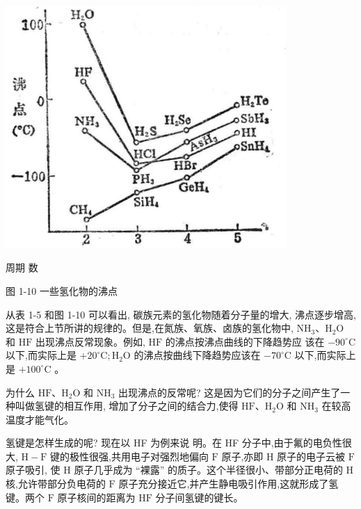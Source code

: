 \documentclass[10pt]{article}
\begin{document}
\begin{center}
\includegraphics[max width=0.8\textwidth]{images/01912d13-9986-7822-a012-3f3f7be99dcb_28_716816.jpg}
\end{center}

周期 数

图 1-10 一些氢化物的沸点

从表 1-5 和图 1-10 可以看出, 碳族元素的氢化物随着分子量的增大, 沸点逐步增高, 这是符合上节所讲的规律的。但是,在氮族、氧族、卤族的氢化物中, \({\mathrm{{NH}}}_{3}\text{、}{\mathrm{H}}_{2}\mathrm{O}\) 和 \(\mathrm{{HF}}\) 出现沸点反常现象。例如, \(\mathrm{{HF}}\) 的沸点按沸点曲线的下降趋势应 该在 \(- {90}^{ \circ }\mathrm{C}\) 以下,而实际上是 \(+ {20}^{ \circ }\mathrm{C};{\mathrm{H}}_{2}\mathrm{O}\) 的沸点按曲线下降趋势应该在 \(- {70}^{ \circ }\mathrm{C}\) 以下,而实际上是 \(+ {100}^{ \circ }\mathrm{C}\) 。

为什么 \(\mathrm{{HF}}\text{、}{\mathrm{H}}_{2}\mathrm{O}\) 和 \({\mathrm{{NH}}}_{3}\) 出现沸点的反常呢? 这是因为它们的分子之间产生了一种叫做氢键的相互作用, 增加了分子之间的结合力,使得 \(\mathrm{{HF}}\text{、}{\mathrm{H}}_{2}\mathrm{O}\) 和 \({\mathrm{{NH}}}_{3}\) 在较高温度才能气化。

氢键是怎样生成的呢? 现在以 HF 为例来说 明。在 HF 分子中,由于氟的电负性很大, \(\mathrm{H} - \mathrm{F}\) 键的极性很强,共用电子对强烈地偏向 \(\mathrm{F}\) 原子,亦即 \(\mathrm{H}\) 原子的电子云被 \(\mathrm{F}\) 原子吸引, 使 \(\mathrm{H}\) 原子几乎成为 “裸露” 的质子。这个半径很小、带部分正电荷的 \(\mathrm{H}\) 核,允许带部分负电荷的 \(\mathrm{F}\) 原子充分接近它,并产生静电吸引作用,这就形成了氢键。两个 \(\mathrm{F}\) 原子核间的距离为 \(\mathrm{{HF}}\) 分子间氢键的键长。
\end{document}
